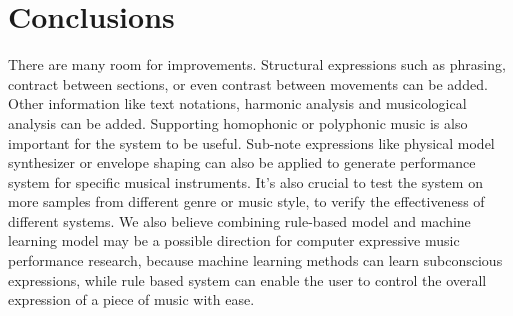 \chapter{Conclusions}
There are many room for improvements. Structural expressions such as phrasing, contract between sections, or even contrast between movements can be added. Other information like text notations, harmonic analysis and musicological analysis can be added. Supporting homophonic or polyphonic music is also important for the system to be useful. Sub-note expressions like physical model synthesizer or envelope shaping can also be applied to generate performance system for specific musical instruments.  It's also crucial to test the system on more samples from different genre or music style, to verify the effectiveness of different systems. We also believe combining rule-based model and machine learning model may be a possible direction for computer expressive music performance research, because machine learning methods can learn subconscious expressions, while rule based system can enable the user to control the overall expression of a piece of music with ease.

